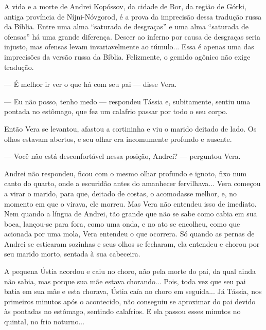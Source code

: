 A vida e a morte de Andrei Kopóssov, da cidade de Bor, da região de
Górki, antiga província de Níjni-Nóvgorod, é a prova da imprecisão dessa
tradução russa da Bíblia. Entre uma alma ``saturada de desgraças'' e uma
alma ``saturada de ofensas'' há uma grande diferença. Descer ao inferno
por causa de desgraças seria injusto, mas ofensas levam invariavelmente
ao túmulo... Essa é apenas uma das imprecisões da versão russa da
Bíblia. Felizmente, o gemido agônico não exige tradução.

--- É melhor ir ver o que há com seu pai --- disse Vera.

--- Eu não posso, tenho medo --- respondeu Tássia e, subitamente, sentiu
uma pontada no estômago, que fez um calafrio passar por todo o seu
corpo.

Então Vera se levantou, afastou a cortininha e viu o marido deitado de
lado. Os olhos estavam abertos, e seu olhar era incomumente profundo e
ausente.

--- Você não está desconfortável nessa posição, Andrei? --- perguntou
Vera.

Andrei não respondeu, ficou com o mesmo olhar profundo e ignoto, fixo
num canto do quarto, onde a escuridão antes do amanhecer fervilhava...
Vera começou a virar o marido, para que, deitado de costas, o acomodasse
melhor, e, no momento em que o virava, ele morreu. Mas Vera não entendeu
isso de imediato. Nem quando a língua de Andrei, tão grande que não se
sabe como cabia em sua boca, lançou-se para fora, como uma onda, e no
ato se encolheu, como que acionada por uma mola, Vera entendeu o que
ocorrera. Só quando as pernas de Andrei se esticaram sozinhas e seus
olhos se fecharam, ela entendeu e chorou por seu marido morto, sentada à
sua cabeceira.

A pequena Ústia acordou e caiu no choro, não pela morte do pai, da qual
ainda não sabia, mas porque sua mãe estava chorando... Pois, toda vez
que seu pai batia em sua mãe e esta chorava, Ústia caía no choro em
seguida... Já Tássia, nos primeiros minutos após o acontecido, não
conseguiu se aproximar do pai devido às pontadas no estômago, sentindo
calafrios. E ela passou esses minutos no quintal, no frio noturno...

